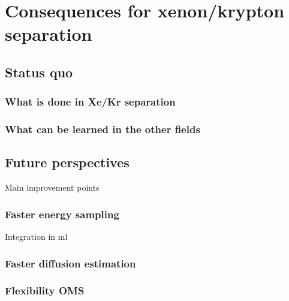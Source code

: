 \documentclass[main.tex]{subfiles}
\begin{document}
\section{Consequences for xenon/krypton separation}

\subsection{Status quo}

\subsubsection{What is done in Xe/Kr separation}

\subsubsection{What can be learned in the other fields}

\subsection{Future perspectives}

Main improvement points

\subsubsection{Faster energy sampling}
Integration in ml
\subsubsection{Faster diffusion estimation}



\subsubsection{Flexibility OMS}

\OnlyInSubfile{\printglobalbibliography}
\end{document}
